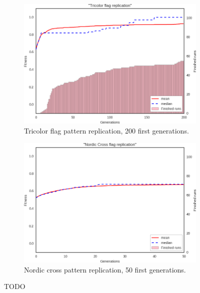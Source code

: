 \begin{figure}[t]
\begin{subfigure}[t]{.45\columnwidth}
\includegraphics[width=\columnwidth]{fig/replicate_tricolor_results}
\caption{Tricolor flag pattern replication, 200 first generations.}
\label{fig:replicate_tricolor_results}
\end{subfigure}
\begin{subfigure}[t]{.45\columnwidth}
\centering
\includegraphics[width=\columnwidth]{fig/replicate_nordic_results}
\caption{Nordic cross pattern replication, 50 first generations.
}
\label{fig:replicate_nordic_results}
\end{subfigure}
\caption{TODO}
\label{fig:replication_results}
\end{figure}

